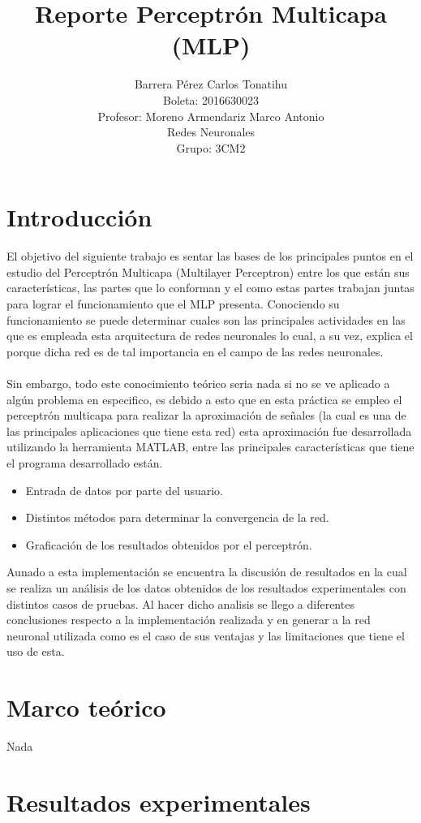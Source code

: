 \documentclass[letterpaper, 12pt, titlepage]{article}
\title{Reporte Perceptrón Multicapa (MLP)}
\author{Barrera Pérez Carlos Tonatihu \\Boleta: 2016630023\\ Profesor: Moreno 
Armendariz Marco Antonio \\ Redes Neuronales \\ Grupo: 3CM2 }
\begin{document}
\maketitle
\tableofcontents
\newpage

\section{Introducción}
El objetivo del siguiente trabajo es sentar las bases de los principales puntos 
en el estudio del Perceptrón Multicapa (Multilayer Perceptron) entre los que 
están sus características, las partes que lo conforman y el como estas partes 
trabajan juntas para lograr el funcionamiento que el MLP presenta. Conociendo 
su funcionamiento se puede determinar cuales son las principales actividades en 
las que es empleada esta arquitectura de redes neuronales lo cual, a su vez, 
explica el porque dicha red es de tal importancia en el campo de las redes 
neuronales.
\\\\
Sin embargo, todo este conocimiento teórico seria nada si no se ve aplicado a 
algún problema en especifico, es debido a esto que en esta práctica se empleo 
el perceptrón multicapa para realizar la aproximación de señales (la cual es 
una de las principales aplicaciones que tiene esta red) esta aproximación fue 
desarrollada utilizando la herramienta MATLAB, entre las principales 
características que tiene el programa desarrollado están.
\begin{itemize}
 \item Entrada de datos por parte del usuario.
 \item Distintos métodos para determinar la convergencia de la red.
 \item Graficación de los resultados obtenidos por el perceptrón.
\end{itemize}
Aunado a esta implementación se encuentra la discusión de resultados en la cual 
se realiza un análisis de los datos obtenidos de los resultados 
experimentales con distintos casos de pruebas. Al hacer dicho analisis se llego 
a diferentes conclusiones respecto a la implementación realizada y en generar a 
la red neuronal utilizada como es el caso de sus ventajas y las limitaciones 
que tiene el uso de esta.

\newpage
\section{Marco teórico}
Nada \cite{libro1}
\section{Resultados experimentales}
\end{document}
